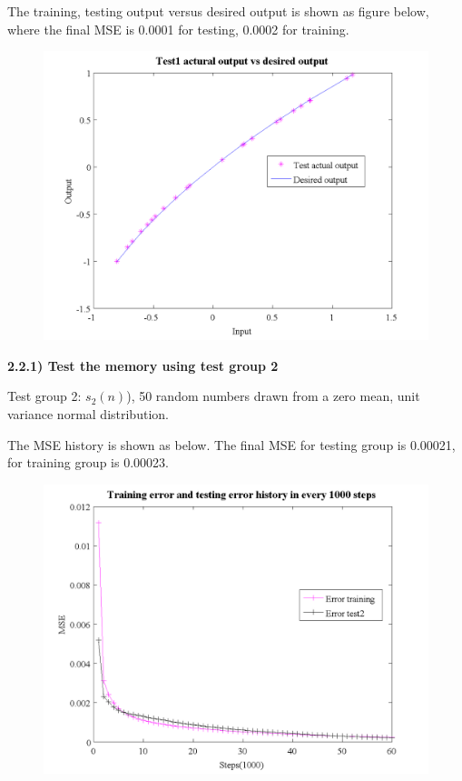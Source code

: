 \documentclass[epsfig]{article}
\def\bpar{\vskip26pt}
\def\npar{\vskip13pt}
\begin{document}
The training, testing output versus desired output is shown as figure below, where the final MSE is 0.0001 for testing, 0.0002 for training.

\begin{figure}[H] 
\centering\includegraphics[width=4.5in]{output_test1.png} 
\end{figure} 




{\bf 
\npar
2.2.1) Test the memory using test group 2

\bpar
}


Test group 2: $s_2{(n)}$), 50 random numbers drawn from a zero mean, unit variance normal distribution.


The MSE history is shown as below.  The final MSE for testing group is 0.00021, for training group is 0.00023.

\begin{figure}[H] 
\centering\includegraphics[width=4.5in]{err_test2.png} 
\end{figure} 
\end{document}
